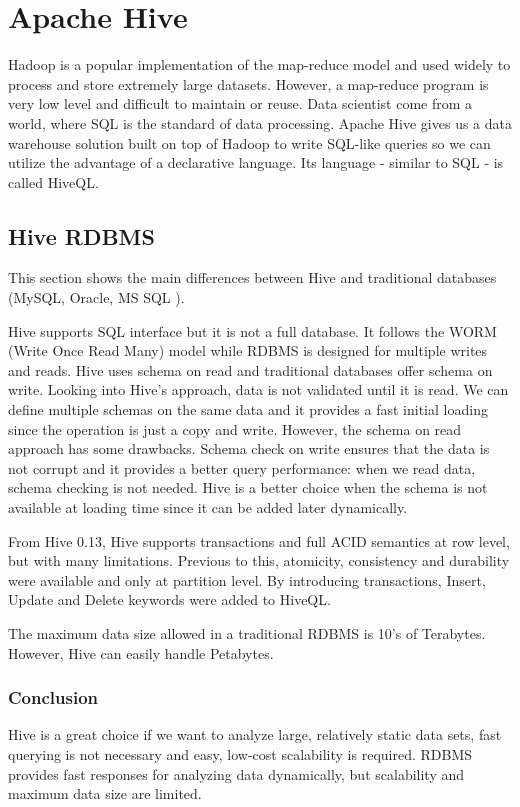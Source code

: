 \chapter{Apache Hive}
Hadoop is a popular implementation of the map-reduce model and used widely to process and store extremely large datasets. However, a map-reduce program is very low level and difficult to maintain or reuse. Data scientist come from a world, where SQL is the standard of data processing. Apache Hive gives us a data warehouse solution built on top of Hadoop to write SQL-like queries so we can utilize the advantage of a declarative language. Its language - similar to SQL - is called HiveQL.

\section{Hive \vs RDBMS}
This section shows the main differences between Hive and traditional databases (\eg MySQL, Oracle, MS SQL \etc).

Hive supports SQL interface but it is not a full database. It follows the WORM (Write Once Read Many) model while RDBMS is designed for multiple writes and reads. Hive uses schema on read and traditional databases offer schema on write. Looking into Hive's approach, data is not validated until it is read. We can define multiple schemas on the same data and it provides a fast initial loading since the operation is just a copy and write. However, the schema on read approach has some drawbacks. Schema check on write ensures that the data is not corrupt and it provides a better query performance: when we read data, schema checking is not needed. Hive is a better choice when the schema is not available at loading time since it can be added later dynamically. 

From Hive 0.13, Hive supports transactions \cite{Hive-apache} and full ACID semantics at row level, but with many limitations. Previous to this, atomicity, consistency and durability were available and only at partition level. By introducing transactions, Insert, Update and Delete keywords were added to HiveQL. 

The maximum data size allowed in a traditional RDBMS is 10's of Terabytes. However, Hive can easily handle Petabytes.

\subsection{Conclusion}
Hive is a great choice if we want to analyze large, relatively static data sets, fast querying is not necessary and easy, low-cost scalability is required. RDBMS provides fast responses for analyzing data dynamically, but scalability and maximum data size are limited.

